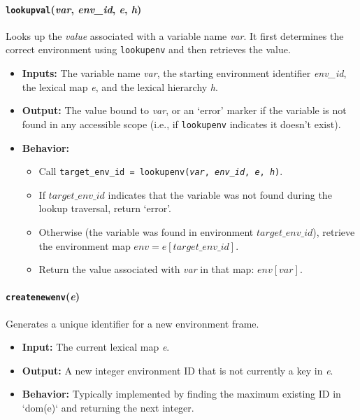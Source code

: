 \documentclass[runningheads]{llncs}
\begin{document}
\paragraph{\texttt{lookupval}(\textit{var}, \textit{env\_id}, \textit{e}, \textit{h})}
Looks up the \textit{value} associated with a variable name \textit{var}. It
first determines the correct environment using \texttt{lookupenv} and then
retrieves the value.
\begin{itemize}
	\item \textbf{Inputs:} The variable name \textit{var}, the starting
	      environment identifier \textit{env\_id}, the lexical map \textit{e}, and the
	      lexical hierarchy \textit{h}.
	\item \textbf{Output:} The value bound to \textit{var}, or an `error' marker
	      if the variable is not found in any accessible scope (i.e., if
	      \texttt{lookupenv} indicates it doesn't exist).
	\item \textbf{Behavior:}
	      \begin{itemize}
		      \item Call \texttt{target\_env\_id = lookupenv(\textit{var},
			            \textit{env\_id}, \textit{e}, \textit{h})}.
		      \item If $target\_env\_id$ indicates that the variable was not found
		            during the lookup traversal, return `error'.
		      \item Otherwise (the variable was found in environment
		            $target\_env\_id$), retrieve the environment map $env = e[target\_env\_id]$.
		      \item Return the value associated with \textit{var} in that map:
		            $env[var]$.
	      \end{itemize}
\end{itemize}

\paragraph{\texttt{createnewenv}(\textit{e})}
Generates a unique identifier for a new environment frame.
\begin{itemize}
	\item \textbf{Input:} The current lexical map \textit{e}.
	\item \textbf{Output:} A new integer environment ID that is not currently a
	      key in \textit{e}.
	\item \textbf{Behavior:} Typically implemented by finding the maximum
	      existing ID in `dom(e)` and returning the next integer.
\end{itemize}
\end{document}
